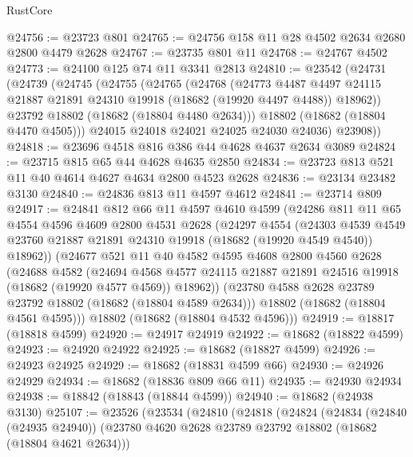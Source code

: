\begin{lexlean}{RustCore}
\begin{coremodule}
@24756 := @23723 @801
@24765 := @24756 @158 @11 @28 @4502 @2634 @2680 @2800 @4479 @2628
@24767 := @23735 @801 @11
@24768 := @24767 @4502
@24773 := @24100 @125 @74 @11 @3341 @2813
@24810 := @23542
    (@24731
      (@24739
        (@24745
          (@24755
            (@24765
              (@24768
                (@24773
                  @4487
                  @4497
                  @24115
                  @21887
                  @21891
                  @24310
                  @19918
                  (@18682 (@19920 @4497 @4488))
                  @18962))
              @23792
              @18802
              (@18682 (@18804 @4480 @2634)))
            @18802
            (@18682 (@18804 @4470 @4505)))
          @24015
          @24018
          @24021
          @24025
          @24030
          @24036)
        @23908))
@24818 := @23696 @4518 @816 @386 @44 @4628 @4637 @2634 @3089
@24824 := @23715 @815 @65 @44 @4628 @4635 @2850
@24834 := @23723 @813 @521 @11 @40 @4614 @4627 @4634 @2800 @4523 @2628
@24836 := @23134 @23482 @3130
@24840 := @24836 @813 @11 @4597 @4612
@24841 := @23714 @809
@24917 := @24841
    @812
    @66
    @11
    @4597
    @4610
    @4599
    (@24286
      @811
      @11
      @65
      @4554
      @4596
      @4609
      @2800
      @4531
      @2628
      (@24297
        @4554
        (@24303
          @4539
          @4549
          @23760
          @21887
          @21891
          @24310
          @19918
          (@18682 (@19920 @4549 @4540))
          @18962))
      (@24677
        @521
        @11
        @40
        @4582
        @4595
        @4608
        @2800
        @4560
        @2628
        (@24688
          @4582
          (@24694
            @4568
            @4577
            @24115
            @21887
            @21891
            @24516
            @19918
            (@18682 (@19920 @4577 @4569))
            @18962))
        (@23780 @4588 @2628 @23789 @23792 @18802 (@18682 (@18804 @4589 @2634)))
        @18802
        (@18682 (@18804 @4561 @4595)))
      @18802
      (@18682 (@18804 @4532 @4596)))
@24919 := @18817 (@18818 @4599)
@24920 := @24917 @24919
@24922 := @18682 (@18822 @4599)
@24923 := @24920 @24922
@24925 := @18682 (@18827 @4599)
@24926 := @24923 @24925
@24929 := @18682 (@18831 @4599 @66)
@24930 := @24926 @24929
@24934 := @18682 (@18836 @809 @66 @11)
@24935 := @24930 @24934
@24938 := @18842 (@18843 (@18844 @4599))
@24940 := @18682 (@24938 @3130)
@25107 := @23526
    (@23534
      (@24810
        (@24818
          (@24824
            (@24834
              (@24840 (@24935 @24940))
              (@23780 @4620 @2628 @23789 @23792 @18802 (@18682 (@18804 @4621 @2634)))

\end{coremodule}
\end{lexlean}
